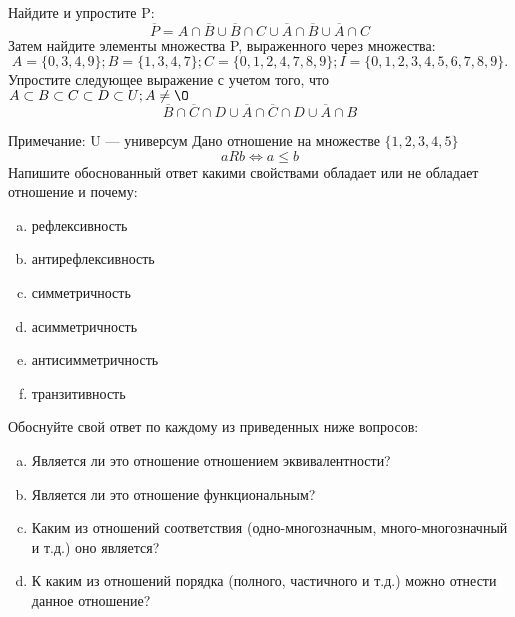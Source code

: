 \documentclass[10pt]{exam}
\begin{document}
\begin{questions}
\question
Найдите и упростите P:
\begin{equation*}
\overline{P} = A \cap \overline{B} \cup \overline{B} \cap C \cup \overline{A} \cap \overline{B} \cup \overline{A} \cap C
\end{equation*}
Затем найдите элементы множества P, выраженного через множества:
\begin{equation*}
A = \{0, 3, 4, 9\}; 
B = \{1, 3, 4, 7\};
C = \{0, 1, 2, 4, 7, 8, 9\};
I = \{0, 1, 2, 3, 4, 5, 6, 7, 8, 9\}.
\end{equation*}\question
Упростите следующее выражение с учетом того, что $A\subset B \subset C \subset D \subset U; A \neq \O$
\begin{equation*}
\overline{B} \cap \overline{C} \cap D \cup \overline{A} \cap \overline{C} \cap D \cup \overline{A} \cap B
\end{equation*}

Примечание: U — универсум\question
Дано отношение на множестве $\{1, 2, 3, 4, 5\}$ 
\begin{equation*}
aRb \iff a \leq b
\end{equation*}
Напишите обоснованный ответ какими свойствами обладает или не обладает отношение и почему:   
\begin{enumerate} [a)]\setcounter{enumi}{0}
\item рефлексивность
\item антирефлексивность
\item симметричность
\item асимметричность
\item антисимметричность
\item транзитивность
\end{enumerate}

Обоснуйте свой ответ по каждому из приведенных ниже вопросов:
\begin{enumerate} [a)]\setcounter{enumi}{0}
    \item Является ли это отношение отношением эквивалентности?
    \item Является ли это отношение функциональным?
    \item Каким из отношений соответствия (одно-многозначным, много-многозначный и т.д.) оно является?
    \item К каким из отношений порядка (полного, частичного и т.д.) можно отнести данное отношение?
\end{enumerate}



\end{questions}
\end{document}

